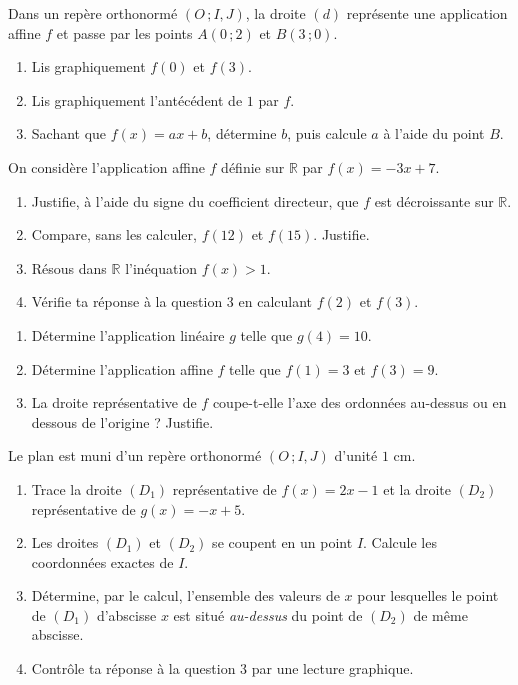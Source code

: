 \documentclass[11pt]{article}
\newcounter{popsec}
\newcounter{popsub}
\newcommand{\courssub}[1]{%
  \stepcounter{popsub}%
  \par\vspace{9pt}\noindent{\popxbold\fontsize{11.5}{13}\selectfont\color{popink}{\color{poporange}\thepopsec.\thepopsub}\hspace{6pt}#1}\par\nopagebreak\vspace{4pt}
}
\begin{document}
\begin{exercice}
Dans un repère orthonormé $(O\,;I,J)$, la droite $(d)$ représente une application affine $f$ et passe par les points $A(0\,;2)$ et $B(3\,;0)$.
\begin{enumerate}
\item Lis graphiquement $f(0)$ et $f(3)$.
\item Lis graphiquement l'antécédent de $1$ par $f$.
\item Sachant que $f(x)=ax+b$, détermine $b$, puis calcule $a$ à l'aide du point $B$.
\end{enumerate}
\end{exercice}

\courssub{Je m'entraîne}

\begin{exercice}
On considère l'application affine $f$ définie sur $\mathbb{R}$ par $f(x)=-3x+7$.
\begin{enumerate}
\item Justifie, à l'aide du signe du coefficient directeur, que $f$ est décroissante sur $\mathbb{R}$.
\item Compare, sans les calculer, $f(12)$ et $f(15)$. Justifie.
\item Résous dans $\mathbb{R}$ l'inéquation $f(x)>1$.
\item Vérifie ta réponse à la question 3 en calculant $f(2)$ et $f(3)$.
\end{enumerate}
\end{exercice}

\begin{exercice}
\begin{enumerate}
\item Détermine l'application linéaire $g$ telle que $g(4)=10$.
\item Détermine l'application affine $f$ telle que $f(1)=3$ et $f(3)=9$.
\item La droite représentative de $f$ coupe-t-elle l'axe des ordonnées au-dessus ou en dessous de l'origine ? Justifie.
\end{enumerate}
\end{exercice}

\begin{exercice}
Le plan est muni d'un repère orthonormé $(O\,;I,J)$ d'unité $1$ cm.
\begin{enumerate}
\item Trace la droite $(D_1)$ représentative de $f(x)=2x-1$ et la droite $(D_2)$ représentative de $g(x)=-x+5$.
\item Les droites $(D_1)$ et $(D_2)$ se coupent en un point $I$. Calcule les coordonnées exactes de $I$.
\item Détermine, par le calcul, l'ensemble des valeurs de $x$ pour lesquelles le point de $(D_1)$ d'abscisse $x$ est situé \emph{au-dessus} du point de $(D_2)$ de même abscisse.
\item Contrôle ta réponse à la question 3 par une lecture graphique.
\end{enumerate}
\end{exercice}
\end{document}
